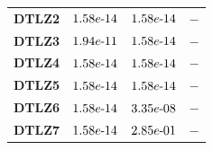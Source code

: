 \documentclass{article}
\begin{document}
\begin{table}[!htp]
\begin{tiny}
\begin{tabular}{c|ccc}
\textbf{DTLZ2} & $\cellcolor{gray25} 1.58e\makebox[0.1cm]{-}14 $ & $ \cellcolor{gray25} 1.58e\makebox[0.1cm]{-}14 $ & $ -$ \\
\textbf{DTLZ3} & $\cellcolor{gray25} 1.94e\makebox[0.1cm]{-}11 $ & $ \cellcolor{gray25} 1.58e\makebox[0.1cm]{-}14 $ & $ -$ \\
\textbf{DTLZ4} & $\cellcolor{gray25} 1.58e\makebox[0.1cm]{-}14 $ & $ \cellcolor{gray25} 1.58e\makebox[0.1cm]{-}14 $ & $ -$ \\
\textbf{DTLZ5} & $\cellcolor{gray25} 1.58e\makebox[0.1cm]{-}14 $ & $ \cellcolor{gray25} 1.58e\makebox[0.1cm]{-}14 $ & $ -$ \\
\textbf{DTLZ6} & $\cellcolor{gray25} 1.58e\makebox[0.1cm]{-}14 $ & $ \cellcolor{gray25} 3.35e\makebox[0.1cm]{-}08 $ & $ -$ \\
\textbf{DTLZ7} & $\cellcolor{gray25} 1.58e\makebox[0.1cm]{-}14 $ & $ 2.85e\makebox[0.1cm]{-}01 $ & $ -$ \\
  \hline
  \end{tabular}
  \end{tiny}
\end{table}
\end{document}
